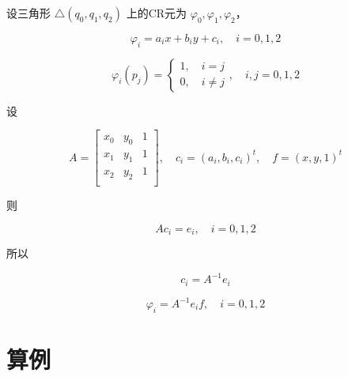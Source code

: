 \documentclass[a4paper,UTF8,titlepage]{ctexart}
\begin{document}
设三角形 $\bigtriangleup(q_0,q_1,q_2)$ 上的CR元为 $\varphi_0, \varphi_1,\varphi_2$，

$$
	\varphi_i = a_i x + b_i y + c_i, \quad i = 0,1,2
$$

$$
	\varphi_i(p_j) = \begin{cases}
		1, \quad i = j \\
		0, \quad i \ne j	
	\end{cases}, \quad i, j = 0,1,2
$$

设

$$
	A = \begin{bmatrix}
		x_0 & y_0 &1 \\
		x_1 & y_1 &1 \\
		x_2 & y_2 &1 \\
	\end{bmatrix}, \quad 
	c_i = (a_i,b_i,c_i)^t , \quad
	f = (x,y,1)^t
$$

则

$$
	A c_i = e_i, \quad i = 0,1,2
$$

所以

$$
	c_i = A^{-1} e_i
$$

$$
	\varphi_i = A^{-1} e_i f, \quad i = 0,1,2
$$ 

\section{算例}
\end{document}
